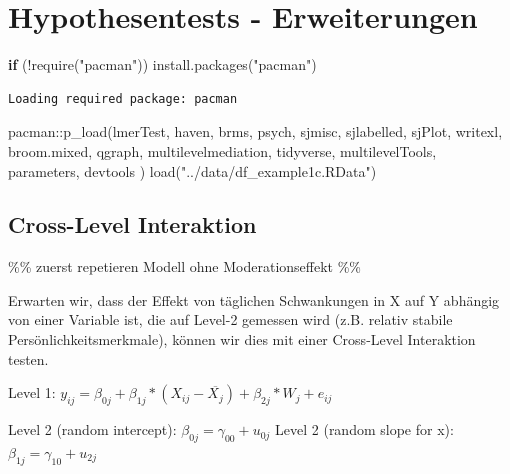 \documentclass[
  letterpaper,
  DIV=11,
  numbers=noendperiod]{scrreprt}
\newenvironment{Shaded}{\begin{snugshade}}{\end{snugshade}}
\newcommand{\ControlFlowTok}[1]{\textcolor[rgb]{0.00,0.23,0.31}{\textbf{#1}}}
\newcommand{\FunctionTok}[1]{\textcolor[rgb]{0.28,0.35,0.67}{#1}}
\newcommand{\NormalTok}[1]{\textcolor[rgb]{0.00,0.23,0.31}{#1}}
\newcommand{\SpecialCharTok}[1]{\textcolor[rgb]{0.37,0.37,0.37}{#1}}
\newcommand{\StringTok}[1]{\textcolor[rgb]{0.13,0.47,0.30}{#1}}
\begin{document}

\chapter{Hypothesentests -
Erweiterungen}\label{hypothesentests---erweiterungen}

\begin{Shaded}
\begin{Highlighting}[]
\ControlFlowTok{if}\NormalTok{ (}\SpecialCharTok{!}\FunctionTok{require}\NormalTok{(}\StringTok{"pacman"}\NormalTok{)) }\FunctionTok{install.packages}\NormalTok{(}\StringTok{"pacman"}\NormalTok{)}
\end{Highlighting}
\end{Shaded}

\begin{verbatim}
Loading required package: pacman
\end{verbatim}

\begin{Shaded}
\begin{Highlighting}[]
\NormalTok{pacman}\SpecialCharTok{::}\FunctionTok{p\_load}\NormalTok{(lmerTest, haven, brms, psych,}
\NormalTok{               sjmisc, sjlabelled, sjPlot, writexl, broom.mixed, qgraph,}
\NormalTok{               multilevelmediation,}
\NormalTok{               tidyverse, multilevelTools, parameters, devtools}
\NormalTok{               )}
\FunctionTok{load}\NormalTok{(}\StringTok{"../data/df\_example1c.RData"}\NormalTok{)}
\end{Highlighting}
\end{Shaded}

\section{Cross-Level Interaktion}\label{cross-level-interaktion}

\%\% zuerst repetieren Modell ohne Moderationseffekt \%\%

Erwarten wir, dass der Effekt von täglichen Schwankungen in X auf Y
abhängig von einer Variable ist, die auf Level-2 gemessen wird (z.B.
relativ stabile Persönlichkeitsmerkmale), können wir dies mit einer
Cross-Level Interaktion testen.

Level 1:
\(y_{ij} = \beta_{0j} + \beta_{1j}*(X_{ij}-\overline{X_j}) + \beta_{2j}*W_{j} + e_{ij}\)

Level 2 (random intercept): \(\beta_{0j} = \gamma_{00} + u_{0j}\) Level
2 (random slope for x): \(\beta_{1j} = \gamma_{10} + u_{2j}\)
\end{document}
